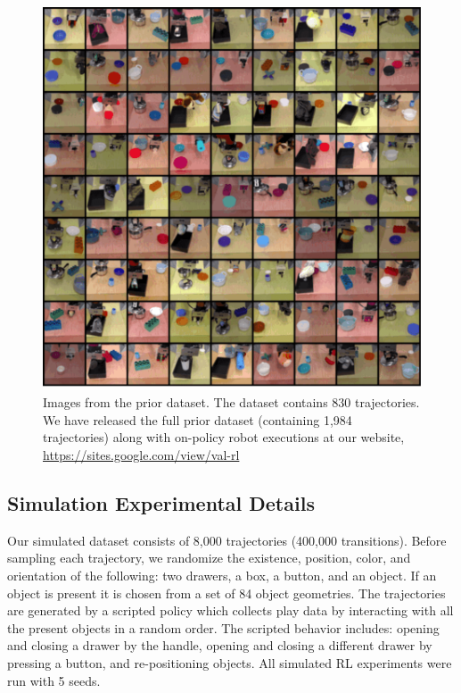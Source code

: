 \begin{figure}
  \includegraphics[width=0.99\linewidth]{val/imgs/prior_data_grid.png}
  \caption{\small
  Images from the prior dataset. The dataset contains 830 trajectories. We have released the full prior dataset (containing 1,984 trajectories) along with on-policy robot executions at our website, \url{https://sites.google.com/view/val-rl}
  }
  \label{fig:appendix_dataset_imgs}
  \vspace{-0.5cm}
\end{figure}

\subsection{Simulation Experimental Details} \label{sec:appendix_sim}

Our simulated dataset consists of 8,000 trajectories (400,000 transitions). Before sampling each trajectory, we randomize the existence, position, color, and orientation of the following: two drawers, a box, a button, and an object. If an object is present it is chosen from a set of 84 object geometries. The trajectories are generated by a scripted policy which collects play data by interacting with all the present objects in a random order. The scripted behavior includes: opening and closing a drawer by the handle, opening and closing a different drawer by pressing a button, and re-positioning objects. All simulated RL experiments were run with 5 seeds.

